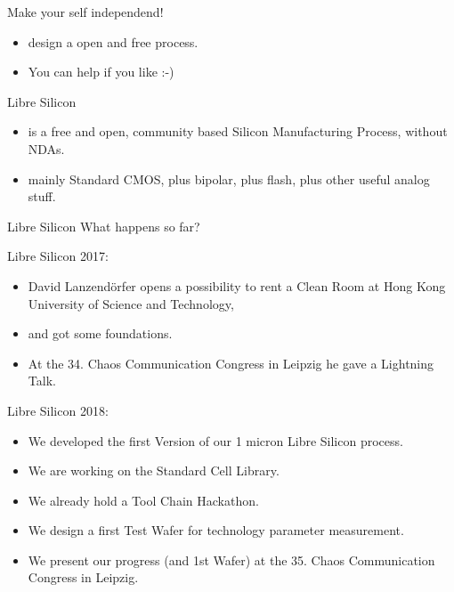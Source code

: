 \documentclass{beamer}
\begin{document}
\begin{frame}
Make your self independend!
\begin{itemize}
\item design a open and free process.
\item You can help if you like :-)
\end{itemize}
\end{frame}

\begin{frame}{Libre Silicon}
\begin{itemize}
\item is a free and open, community based Silicon Manufacturing Process, without NDAs.
\item mainly Standard CMOS, plus bipolar, plus flash, plus other useful analog stuff.
\end{itemize}
\end{frame}

\begin{frame}{Libre Silicon}
What happens so far?
\end{frame}

\begin{frame}{Libre Silicon}
2017:
\begin{itemize}
\item David Lanzendörfer opens a possibility to rent a Clean Room at Hong Kong University of Science and Technology,
\item and got some foundations.
\item At the 34. Chaos Communication Congress in Leipzig he gave a Lightning Talk.
\end{itemize}
\end{frame}

\begin{frame}{Libre Silicon}
2018:
\begin{itemize}
\item We developed the first Version of our 1 micron Libre Silicon process.
\item We are working on the Standard Cell Library.
\item We already hold a Tool Chain Hackathon.
\item We design a first Test Wafer for technology parameter measurement.
\item We present our progress (and 1st Wafer) at the 35. Chaos Communication Congress in Leipzig.
\end{itemize}
\end{frame}
\end{document}
